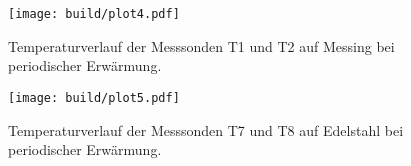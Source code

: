 \begin{figure}
    \centering
    \texttt{[image: build/plot4.pdf]}
    \caption{Temperaturverlauf der Messsonden T1 und T2 auf Messing bei periodischer Erwärmung.} 
    \label{fig:plot4}
\end{figure}


\begin{figure}
    \centering
    \texttt{[image: build/plot5.pdf]}
    \caption{Temperaturverlauf der Messsonden T7 und T8 auf Edelstahl bei periodischer Erwärmung.} 
    \label{fig:plot5}
\end{figure}